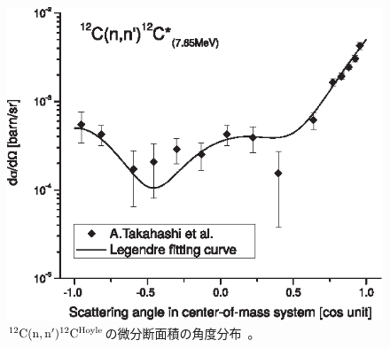 \begin{figure}
  \centering
  \includegraphics[clip, width=0.6\columnwidth]{eps/cross_section_12C_n_n_12C_7.65.eps}
  \caption[${}^{12}{\rm C}({\rm n},{\rm n}'){}^{12}{\rm C}^{\rm Hoyle}$の微分断面積の角度分布。]
          {${}^{12}{\rm C}({\rm n},{\rm n}'){}^{12}{\rm C}^{\rm Hoyle}$の微分断面積の角度分布~\cite{kondoetal}。}
  \label{fig::sig_angle_dist}
\end{figure}

